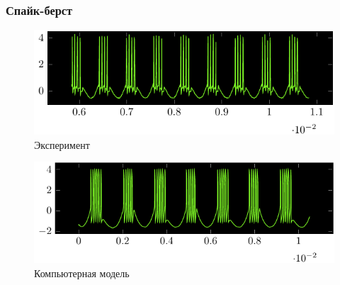 \begin{frame}%
	\frametitle{Спайк-берст}
	\begin{figure}[h]
		\hspace{-1.3em}
		\centering
		\includegraphics[]{img/berst}
		\vspace{-1.5em}
		\caption{Эксперимент}
	\end{figure}
	\begin{figure}[h]
		\hspace{-2em}
		\centering
		\includegraphics[]{img/berst_matlab}
		\vspace{-1.5em}
		\caption{Компьютерная модель}
	\end{figure}	
\end{frame}
	
